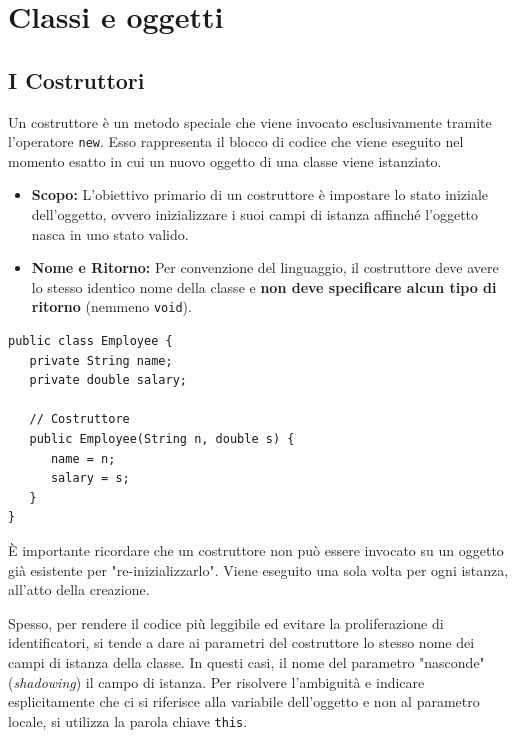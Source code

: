 \chapter{Classi e oggetti}

\section{I Costruttori}

Un costruttore è un metodo speciale che viene invocato esclusivamente tramite l'operatore \texttt{new}. Esso rappresenta il blocco di codice che viene eseguito nel momento esatto in cui un nuovo oggetto di una classe viene istanziato.

\begin{itemize}
    \item \textbf{Scopo:} L'obiettivo primario di un costruttore è impostare lo stato iniziale dell'oggetto, ovvero inizializzare i suoi campi di istanza affinché l'oggetto nasca in uno stato valido.
    \item \textbf{Nome e Ritorno:} Per convenzione del linguaggio, il costruttore deve avere lo stesso identico nome della classe e \textbf{non deve specificare alcun tipo di ritorno} (nemmeno \texttt{void}).
\end{itemize}

\begin{lstlisting}[caption={Esempio di costruttore base}]
public class Employee {
   private String name;
   private double salary;

   // Costruttore
   public Employee(String n, double s) {
      name = n;
      salary = s;
   }
}
\end{lstlisting}



\begin{observation}
    È importante ricordare che un costruttore non può essere invocato su un oggetto già esistente per "re-inizializzarlo". Viene eseguito una sola volta per ogni istanza, all'atto della creazione.
\end{observation}

Spesso, per rendere il codice più leggibile ed evitare la proliferazione di identificatori, si tende a dare ai parametri del costruttore lo stesso nome dei campi di istanza della classe. In questi casi, il nome del parametro "nasconde" (\textit{shadowing}) il campo di istanza. Per risolvere l'ambiguità e indicare esplicitamente che ci si riferisce alla variabile dell'oggetto e non al parametro locale, si utilizza la parola chiave \texttt{this}.

